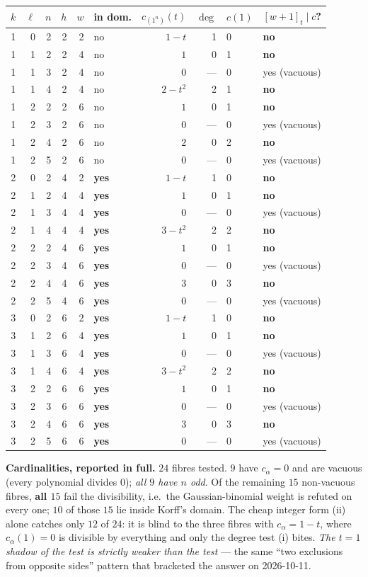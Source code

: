\documentclass[11pt]{article}
\theoremstyle{plain}
\theoremstyle{definition}
\theoremstyle{remark}
\newcommand{\qbin}[1]{[#1]_t}
\begin{document}
\begin{center}\small
\begin{tabular}{@{}rrr r r l r r l l@{}}
\toprule
$k$&$\ell$&$n$&$h$&$w$&in dom.&$c_{(1^n)}(t)$&$\deg$&$c(1)$&$\qbin{w+1}\mid c$?\\
\midrule
1&0&2&2&2&no &$1-t$&1&0&\textbf{no}\\
1&1&2&2&4&no &$1$&0&1&\textbf{no}\\
1&1&3&2&4&no &$0$&---&0&yes (vacuous)\\
1&1&4&2&4&no &$2-t^2$&2&1&\textbf{no}\\
1&2&2&2&6&no &$1$&0&1&\textbf{no}\\
1&2&3&2&6&no &$0$&---&0&yes (vacuous)\\
1&2&4&2&6&no &$2$&0&2&\textbf{no}\\
1&2&5&2&6&no &$0$&---&0&yes (vacuous)\\
2&0&2&4&2&\textbf{yes}&$1-t$&1&0&\textbf{no}\\
2&1&2&4&4&\textbf{yes}&$1$&0&1&\textbf{no}\\
2&1&3&4&4&\textbf{yes}&$0$&---&0&yes (vacuous)\\
2&1&4&4&4&\textbf{yes}&$3-t^2$&2&2&\textbf{no}\\
2&2&2&4&6&\textbf{yes}&$1$&0&1&\textbf{no}\\
2&2&3&4&6&\textbf{yes}&$0$&---&0&yes (vacuous)\\
2&2&4&4&6&\textbf{yes}&$3$&0&3&\textbf{no}\\
2&2&5&4&6&\textbf{yes}&$0$&---&0&yes (vacuous)\\
3&0&2&6&2&\textbf{yes}&$1-t$&1&0&\textbf{no}\\
3&1&2&6&4&\textbf{yes}&$1$&0&1&\textbf{no}\\
3&1&3&6&4&\textbf{yes}&$0$&---&0&yes (vacuous)\\
3&1&4&6&4&\textbf{yes}&$3-t^2$&2&2&\textbf{no}\\
3&2&2&6&6&\textbf{yes}&$1$&0&1&\textbf{no}\\
3&2&3&6&6&\textbf{yes}&$0$&---&0&yes (vacuous)\\
3&2&4&6&6&\textbf{yes}&$3$&0&3&\textbf{no}\\
3&2&5&6&6&\textbf{yes}&$0$&---&0&yes (vacuous)\\
\bottomrule
\end{tabular}
\end{center}

\noindent\textbf{Cardinalities, reported in full.} $24$ fibres tested. $9$ have
$c_\alpha=0$ and are vacuous (every polynomial divides $0$); \emph{all $9$ have $n$ odd}.
Of the remaining $15$ non-vacuous fibres, \textbf{all $15$} fail the divisibility, i.e.\ the
Gaussian-binomial weight is refuted on every one; $10$ of those $15$ lie inside Korff's
domain. The cheap integer form (ii) alone catches only $12$ of $24$: it is blind to the
three fibres with $c_\alpha=1-t$, where $c_\alpha(1)=0$ is divisible by everything and only
the degree test (i) bites. \emph{The $t=1$ shadow of the test is strictly weaker than the
test} --- the same ``two exclusions from opposite sides'' pattern that bracketed the answer
on 2026-10-11.
\end{document}
